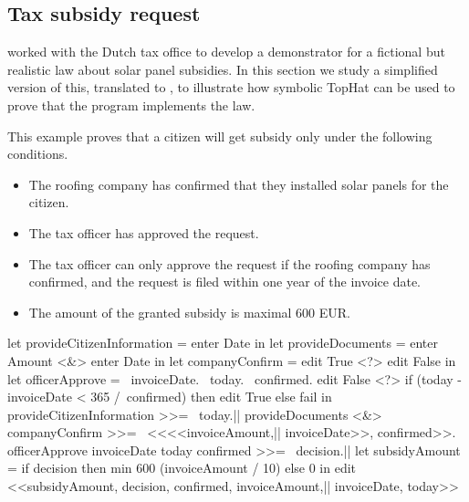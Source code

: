 \subsection{Tax subsidy request}

\citet{conf/sfp/StutterheimAP17} worked with the Dutch tax office to develop a demonstrator for a fictional but realistic law about solar panel subsidies.
In this section we study a simplified version of this, translated to \TOPHAT, to illustrate how symbolic TopHat can be used to prove that the program implements the law.

This example proves that a citizen will get subsidy only under the following conditions.
\begin{itemize}
\item The roofing company has confirmed that they installed solar panels for the citizen.
\item The tax officer has approved the request.
\item The tax officer can only approve the request if the roofing company has confirmed, and the request is filed within one year of the invoice date.
\item The amount of the granted subsidy is maximal 600 EUR.
\end{itemize}

\begin{TASK}[ float
            , escapechar=|
            , numbers=right
            , numbersep=-9pt %
            , caption=Subsidy request and approval workflow at the Dutch tax office.
            , label=fig:thetaxman
            ]
  let provideCitizenInformation = enter Date in
  let provideDocuments = enter Amount <&> enter Date in
  let companyConfirm = edit True <?> edit False in
  let officerApprove = \ invoiceDate. \ today. \ confirmed.
    edit False <?> if (today - invoiceDate < 365 /\ confirmed)
      then edit True else fail in
  provideCitizenInformation >>= \ today.|\label{fig:taxman-citizen-info}|
  provideDocuments <&> companyConfirm >>= \ <<<<invoiceAmount,|\label{fig:taxman-documents-and-company-confirm}|
    invoiceDate>>, confirmed>>.
  officerApprove invoiceDate today confirmed >>= \ decision.|\label{fig:taxman-officer-approve}|
  let subsidyAmount = if decision
    then min 600 (invoiceAmount / 10) else 0 in
  edit <<subsidyAmount, decision, confirmed, invoiceAmount,|\label{fig:taxman-result}|
    invoiceDate, today>>
\end{TASK}

